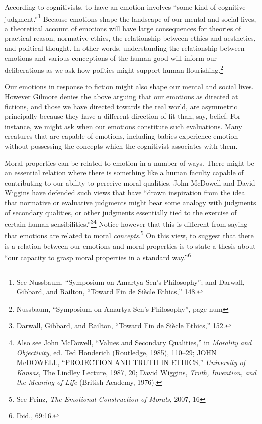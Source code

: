 \documentclass[phdthesis,12pt,final]{wuthesis}
\theoremstyle{definition}
\theoremstyle{definition}
\theoremstyle{definition}
\theoremstyle{definition}
\theoremstyle{remark}
\begin{document}
According to cognitivists, to have an emotion involves ``some kind of cognitive judgment.''\footnote{See Nussbaum, {``Symposium on {Amartya Sen}'s Philosophy''}; and Darwall, Gibbard, and Railton, {``Toward Fin de Siècle Ethics,''} 148.} Because emotions shape the landscape of our mental and social lives, a theoretical account of emotions will have large consequences for theories of practical reason, normative ethics, the relationship between ethics and aesthetics, and political thought. In other words, understanding the relationship between emotions and various conceptions of the human good will inform our deliberations as we ask how politics might support human flourishing.\footnote{Nussbaum, {``Symposium on {Amartya Sen}'s Philosophy''}, page num}

Our emotions in response to fiction might also shape our mental and social lives. However Gilmore denies the above arguing that our emotions as directed at fictions, and those we have directed towards the real world, are asymmetric principally because they have a different direction of fit than, say, belief. For instance, we might ask when our emotions constitute such evaluations. Many creatures that are capable of emotions, including babies experience emotion without possessing the concepts which the cognitivist associates with them.

Moral properties can be related to emotion in a number of ways. There might be an essential relation where there is something like a human faculty capable of contributing to our ability to perceive moral qualities. John McDowell and David Wiggins have defended such views that have ``drawn inspiration from the idea that normative or evaluative judgments might bear some analogy with judgments of secondary qualities, or other judgments essentially tied to the exercise of certain human sensibilities.''\footnote{Darwall, Gibbard, and Railton, {``Toward Fin de Siècle Ethics,''} 152.}\footnote{Also see John McDowell, {``Values and {Secondary Qualities},''} in \emph{Morality and {Objectivity}}, ed. Ted Honderich (Routledge, 1985), 110--29; JOHN McDOWELL, {``{PROJECTION AND TRUTH IN ETHICS},''} \emph{University of Kansas}, The {Lindley Lecture}, 1987, 20; David Wiggins, \emph{Truth, {Invention}, and the {Meaning} of {Life}} (British Academy, 1976).} Notice however that this is different from saying that emotions are related to moral \emph{concepts}.\footnote{See Prinz, \emph{The {Emotional Construction} of {Morals}}, 2007, 16} On this view, to suggest that there is a relation between our emotions and moral properties is to state a thesis about ``our capacity to grasp moral properties in a standard way.''\footnote{Ibid., 69:16.}
\end{document}
